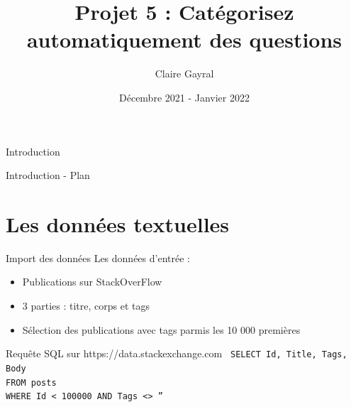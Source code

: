 \documentclass[10pt]{beamer}
\title{Projet 5 : Catégorisez automatiquement des questions}
\author{Claire Gayral}
\date{Décembre 2021 - Janvier 2022}
\begin{document}
\begin{frame}{}
    \frametitle{}
    \titlepage
\end{frame}
\begin{frame}{Introduction}

\end{frame}
\begin{frame}{Introduction - Plan}
    \tableofcontents
\end{frame}

\section{Les données textuelles}

\begin{frame}{Import des données}
    Les données d'entrée : 
    \begin{itemize}
        \item Publications sur StackOverFlow
        \item 3 parties : titre, corps et tags
        \item Sélection des publications avec tags parmis les 10 000 premières
    \end{itemize}
    \vspace{0.5cm}
    \begin{block}{Requête SQL sur https://data.stackexchange.com}
        \texttt{
            SELECT Id, Title, Tags, Body \\ 
            FROM posts \\
            WHERE Id < 100000 AND Tags <> '' 
        }
    \end{block}
\end{frame}
    
    
\end{document}
